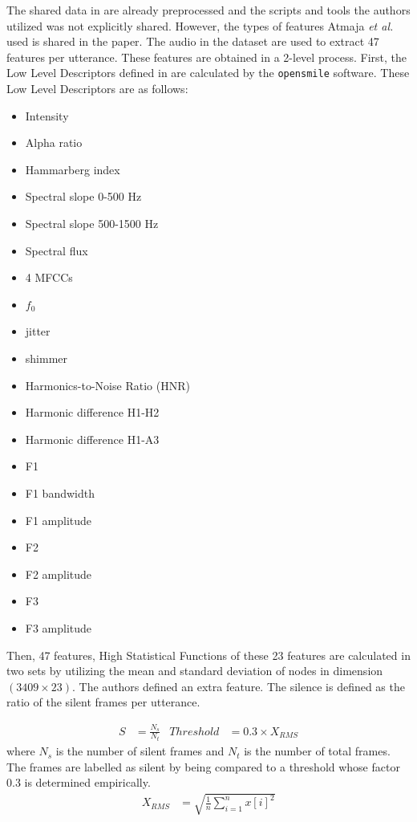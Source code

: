 \documentclass[a4paper,11pt]{article}
\begin{document}
The shared data in \cite{atmaja2020deep} are already preprocessed and the scripts and tools the authors utilized was not explicitly shared. However, the types of features Atmaja \textit{et al.} used is shared in the paper.  
The audio in the dataset are used to extract 47 features per utterance.
These features are obtained in a 2-level process. First, the Low Level Descriptors defined in \cite{eyben2010opensmile} are calculated by the \texttt{opensmile} software. These Low Level Descriptors are as follows: 
\begin{multicols}{2}
\begin{itemize}
    \item Intensity
    \item Alpha ratio
    \item Hammarberg index
    \item Spectral slope 0-500 Hz
    \item Spectral slope 500-1500 Hz
    \item Spectral flux
    \item 4 MFCCs
    \item $f_0$
    \item jitter
    \item shimmer
    \item Harmonics-to-Noise Ratio (HNR)
    \item Harmonic difference H1-H2
    \item Harmonic difference H1-A3
    \item F1
    \item F1 bandwidth
    \item F1 amplitude
    \item F2
    \item F2 amplitude
    \item F3 
    \item F3 amplitude
\end{itemize}
\end{multicols}

Then, 47 features, High Statistical Functions of these 23 features are calculated in two sets by utilizing the mean and standard deviation of nodes in dimension $(3409 \times 23)$. The authors defined an extra feature. The silence is defined as the ratio of the silent frames per utterance. 

\begin{align}
    S &= \frac{N_s}{N_t} & Threshold &= 0.3 \times X_{RMS}
\end{align}
where $N_s$ is the number of silent frames and $N_t$ is the number of total frames.
The frames are labelled as silent by being compared to a threshold whose factor 0.3 is determined empirically. 
\begin{align}
    X_{RMS} &= \sqrt{\frac{1}{n}\sum_{i=1}^n{x[i]}^2}
\end{align}
\end{document}
